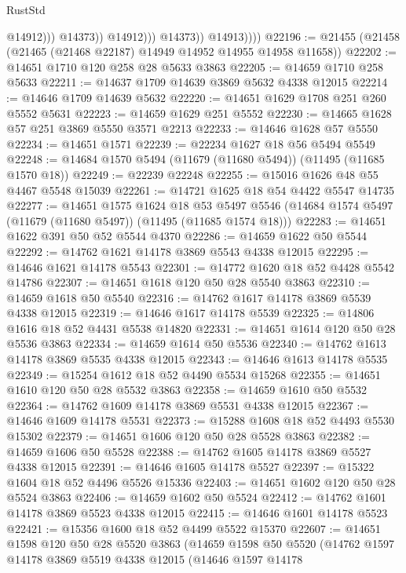 \begin{lexlean}{RustStd}
\begin{coremodule}
                                @14912)))
                          @14373))
                      @14912)))
                @14373))
            @14913))))
@22196 := @21455 (@21458 (@21465 (@21468 @22187) @14949 @14952 @14955 @14958 @11658))
@22202 := @14651 @1710 @120 @258 @28 @5633 @3863
@22205 := @14659 @1710 @258 @5633
@22211 := @14637 @1709 @14639 @3869 @5632 @4338 @12015
@22214 := @14646 @1709 @14639 @5632
@22220 := @14651 @1629 @1708 @251 @260 @5552 @5631
@22223 := @14659 @1629 @251 @5552
@22230 := @14665 @1628 @57 @251 @3869 @5550 @3571 @2213
@22233 := @14646 @1628 @57 @5550
@22234 := @14651 @1571
@22239 := @22234 @1627 @18 @56 @5494 @5549
@22248 := @14684 @1570 @5494 (@11679 (@11680 @5494)) (@11495 (@11685 @1570 @18))
@22249 := @22239 @22248
@22255 := @15016 @1626 @48 @55 @4467 @5548 @15039
@22261 := @14721 @1625 @18 @54 @4422 @5547 @14735
@22277 := @14651
    @1575
    @1624
    @18
    @53
    @5497
    @5546
    (@14684 @1574 @5497 (@11679 (@11680 @5497)) (@11495 (@11685 @1574 @18)))
@22283 := @14651 @1622 @391 @50 @52 @5544 @4370
@22286 := @14659 @1622 @50 @5544
@22292 := @14762 @1621 @14178 @3869 @5543 @4338 @12015
@22295 := @14646 @1621 @14178 @5543
@22301 := @14772 @1620 @18 @52 @4428 @5542 @14786
@22307 := @14651 @1618 @120 @50 @28 @5540 @3863
@22310 := @14659 @1618 @50 @5540
@22316 := @14762 @1617 @14178 @3869 @5539 @4338 @12015
@22319 := @14646 @1617 @14178 @5539
@22325 := @14806 @1616 @18 @52 @4431 @5538 @14820
@22331 := @14651 @1614 @120 @50 @28 @5536 @3863
@22334 := @14659 @1614 @50 @5536
@22340 := @14762 @1613 @14178 @3869 @5535 @4338 @12015
@22343 := @14646 @1613 @14178 @5535
@22349 := @15254 @1612 @18 @52 @4490 @5534 @15268
@22355 := @14651 @1610 @120 @50 @28 @5532 @3863
@22358 := @14659 @1610 @50 @5532
@22364 := @14762 @1609 @14178 @3869 @5531 @4338 @12015
@22367 := @14646 @1609 @14178 @5531
@22373 := @15288 @1608 @18 @52 @4493 @5530 @15302
@22379 := @14651 @1606 @120 @50 @28 @5528 @3863
@22382 := @14659 @1606 @50 @5528
@22388 := @14762 @1605 @14178 @3869 @5527 @4338 @12015
@22391 := @14646 @1605 @14178 @5527
@22397 := @15322 @1604 @18 @52 @4496 @5526 @15336
@22403 := @14651 @1602 @120 @50 @28 @5524 @3863
@22406 := @14659 @1602 @50 @5524
@22412 := @14762 @1601 @14178 @3869 @5523 @4338 @12015
@22415 := @14646 @1601 @14178 @5523
@22421 := @15356 @1600 @18 @52 @4499 @5522 @15370
@22607 := @14651
    @1598
    @120
    @50
    @28
    @5520
    @3863
    (@14659
      @1598
      @50
      @5520
      (@14762
        @1597
        @14178
        @3869
        @5519
        @4338
        @12015
        (@14646
          @1597
          @14178

\end{coremodule}
\end{lexlean}
